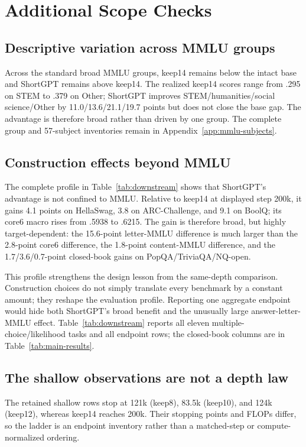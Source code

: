 \section{Additional Scope Checks}
\label{sec:analysis}

\subsection{Descriptive variation across MMLU groups}

Across the standard broad MMLU groups, keep14 remains below the intact base and
ShortGPT remains above keep14. The realized keep14 scores range from .295 on
STEM to .379 on Other; ShortGPT improves STEM/humanities/social science/Other
by 11.0/13.6/21.1/19.7 points but does not close the base gap. The advantage is
therefore broad rather than driven by one group. The complete group and
57-subject inventories remain in Appendix~\ref{app:mmlu-subjects}.

\subsection{Construction effects beyond MMLU}

The complete profile in Table~\ref{tab:downstream} shows that ShortGPT's
advantage is not confined to MMLU. Relative to keep14 at displayed step 200k,
it gains 4.1 points on HellaSwag, 3.8 on ARC-Challenge, and 9.1 on BoolQ; its
core6 macro rises from .5938 to .6215. The gain is therefore broad, but highly
target-dependent: the 15.6-point letter-MMLU difference is much larger than the
2.8-point core6 difference, the 1.8-point content-MMLU difference, and the
1.7/3.6/0.7-point closed-book gains on PopQA/TriviaQA/NQ-open.

This profile strengthens the design lesson from the same-depth comparison.
Construction choices do not simply translate every benchmark by a constant
amount; they reshape the evaluation profile. Reporting one aggregate endpoint
would hide both ShortGPT's broad benefit and the unusually large
answer-letter-MMLU effect. Table~\ref{tab:downstream} reports all eleven
multiple-choice/likelihood tasks and all endpoint rows; the
closed-book columns are in Table~\ref{tab:main-results}.

\subsection{The shallow observations are not a depth law}
The retained shallow rows stop at 121k (keep8), 83.5k (keep10), and 124k (keep12), whereas keep14 reaches 200k. Their stopping points and FLOPs differ, so the ladder is an endpoint inventory rather than a matched-step or compute-normalized ordering.

